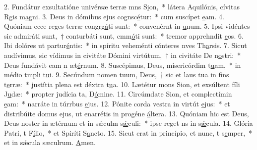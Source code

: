 2. Fundátur exsultatióne univérsæ terræ mns S\uline{i}on,~* látera Aquilónis, cívitas Rgis m\uline{a}gni.
3. Deus in dómibus ejus cognsc\uline{é}tur:~* cum suscípet \uline{e}am.
4. Quóniam ecce reges terræ congrg\uline{á}ti sunt:~* convenérnt in \uline{u}num.
5. Ipsi vidéntes sic admiráti sunt,~† conturbáti sunt, cmm\uline{ó}ti sunt:~* tremor apprehndit \uline{e}os.
6. Ibi dolóres ut partur\uline{é}ntis:~* in spíritu veheménti cónteres nves Th\uline{a}rsis.
7. Sicut audívimus, sic vídimus in civitáte Dómini virtútum,~† in civitáte De n\uline{o}stri:~* Deus fundávit eam n æt\uline{é}rnum.
8. Suscépimus, Deus, misericórdim t\uline{u}am,~* in médio tmpli t\uline{u}i.
9. Secúndum nomen tuum, Deus,~† sic et laus tua in fins t\uline{e}rræ:~* justítia plena est déxtra t\uline{u}a.
10. Lætétur mons Sion, et exsúltent fíli J\uline{u}dæ:~* propter judícia ta, D\uline{ó}mine.
11. Circúmdate Sion, et complectímin \uline{e}am:~* narráte in túrrbus \uline{e}jus.
12. Pónite corda vestra in virtút \uline{e}jus:~* et distribúite domus ejus, ut enarrétis in progéne \uline{á}ltera.
13. Quóniam hic est Deus, Deus noster in ætérnum et in sǽculm s\uline{ǽ}culi:~* ipse reget ns in s\uline{ǽ}cula.
14. Glória Patri, t F\uline{í}lio,~* et Spiríti S\uline{a}ncto.
15. Sicut erat in princípio, et nunc, t s\uline{e}mper,~* et in sǽcula sæculrum. \uline{A}men.
